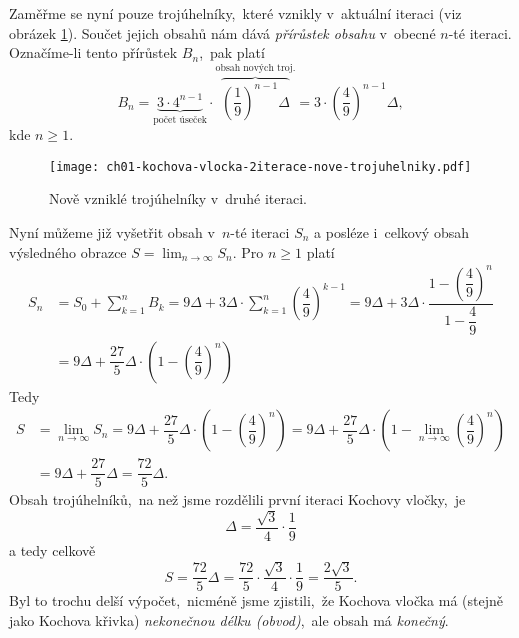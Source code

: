 Zaměřme se nyní pouze trojúhelníky,~které vznikly v~aktuální iteraci (viz obrázek \ref{fig:kochova_vlocka_2iterace_nove_trojuhelniky}). Součet jejich obsahů nám dává \emph{přírůstek obsahu} v~obecné $n$-té iteraci. Označíme-li tento přírůstek $B_n$,~pak platí
\[B_n=\underbrace{3\cdot 4^{n-1}}_{\text{počet úseček}}\cdot\overbrace{\left(\dfrac{1}{9}\right)^{n-1}\Delta}^{\text{obsah nových troj.}}=3\cdot\left(\dfrac{4}{9}\right)^{n-1}\Delta,\]
kde $n\geqslant 1$.
\begin{figure}[h]
    \centering
    \texttt{[image: ch01-kochova-vlocka-2iterace-nove-trojuhelniky.pdf]}
    \caption{Nově vzniklé trojúhelníky v~druhé iteraci.}
    \label{fig:kochova_vlocka_2iterace_nove_trojuhelniky}
\end{figure}
Nyní můžeme již vyšetřit obsah v~$n$-té iteraci $S_n$ a posléze i~celkový obsah výsledného obrazce $S=\lim_{n\to\infty}{S_n}$. Pro $n\geqslant 1$ platí
\begin{align*}
    S_n&=S_0+\sum_{k=1}^{n}{B_k}=9\Delta+3\Delta\cdot\sum_{k=1}^{n}{\left(\dfrac{4}{9}\right)^{k-1}}=9\Delta+3\Delta\cdot\dfrac{1-\left(\dfrac{4}{9}\right)^{n}}{1-\dfrac{4}{9}}\\
    &=9\Delta+\dfrac{27}{5}\Delta\cdot\left(1-\left(\dfrac{4}{9}\right)^n\right)
\end{align*}
Tedy
\begin{align*}
    S&=\lim_{n\to\infty}{S_n}=9\Delta+\dfrac{27}{5}\Delta\cdot\left(1-\left(\dfrac{4}{9}\right)^n\right)=9\Delta+\dfrac{27}{5}\Delta\cdot\left(1-\lim_{n\to\infty}\left(\dfrac{4}{9}\right)^n\right)\\
    &=9\Delta+\dfrac{27}{5}\Delta=\dfrac{72}{5}\Delta.
\end{align*}
Obsah trojúhelníků,~na než jsme rozdělili první iteraci Kochovy vločky,~je
\[\Delta=\dfrac{\sqrt{3}}{4}\cdot\dfrac{1}{9}\]
a tedy celkově
\[S=\dfrac{72}{5}\Delta=\dfrac{72}{5}\cdot\dfrac{\sqrt{3}}{4}\cdot\dfrac{1}{9}=\dfrac{2\sqrt{3}}{5}.\]
Byl to trochu delší výpočet,~nicméně jsme zjistili,~že Kochova vločka má (stejně jako Kochova křivka) \emph{nekonečnou délku (obvod)},~ale obsah má \emph{konečný}.
